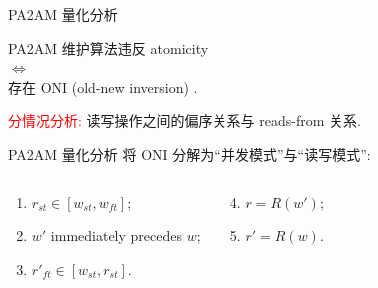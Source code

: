 \begin{frame}{PA2AM 量化分析}
  \vspace{0.10cm}

  \begin{ctheorem}[充要条件]
	\begin{center}
	  PA2AM 维护算法违反 atomicity\\
	  $\iff$\\
	  存在 ONI (old-new inversion) .
	\end{center}
	\vspace{-0.50cm}
  \end{ctheorem}

  \pause

  \begin{cproof}
	\textcolor{red}{分情况分析:} 读写操作之间的偏序关系与 reads-from 关系.
  \end{cproof}
\end{frame}
\begin{frame}{PA2AM 量化分析}
  将 ONI 分解为``并发模式''与``读写模式'':

  \begin{columns}
	  \begin{cdef}
		\begin{enumerate}
		  \item $r_{st} \in [w_{st}, w_{ft}]$;
		  \item $w'$ immediately precedes $w$;
		  \item $r'_{ft} \in [w_{st}, r_{st}]$.
		\end{enumerate}
	  \end{cdef}
	  \begin{cdef}
		\begin{enumerate}
		  \setcounter{enumi}{3}
		  \item $r = R(w')$;
		  \item $r' = R(w)$.
		\end{enumerate}
	  \end{cdef}
  \end{columns}
\end{frame}
